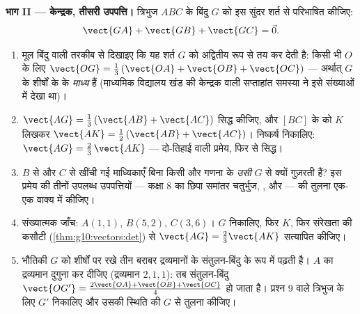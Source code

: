 \begin{problem}
\medskip
\noindent\textbf{भाग II --- केन्द्रक, तीसरी उपपत्ति।}
त्रिभुज $ABC$ के बिंदु $G$ को इस सुंदर शर्त से परिभाषित कीजिए:
\[
\vect{GA} + \vect{GB} + \vect{GC} = \vec 0 .
\]
\begin{enumerate}[resume]
  \item मूल बिंदु वाली तरकीब से दिखाइए कि यह शर्त $G$ को अद्वितीय रूप से
        तय कर देती है: किसी भी $O$ के लिए $\vect{OG} = \frac13\left(\vect{OA} + \vect{OB} +
        \vect{OC}\right)$ --- अर्थात् $G$ के
         शीर्षों के  के \emph{माध्य} हैं (माध्यमिक
        विद्यालय खंड की केन्द्रक वाली सप्ताहांत समस्या ने इसे संख्याओं में
        देखा था)।
  \item $\vect{AG} = \frac13\left(\vect{AB} +
        \vect{AC}\right)$ सिद्ध कीजिए, और $[BC]$ के  को $K$ लिखकर $\vect{AK} = \frac12\left(\vect{AB} +
        \vect{AC}\right)$।
        निष्कर्ष निकालिए: $\vect{AG} = \frac23\,\vect{AK}$ --- दो-तिहाई वाली प्रमेय, फिर से सिद्ध।
  \item $B$ से और $C$ से खींची गई माध्यिकाएँ बिना किसी और गणना के
        \emph{उसी} $G$ से क्यों गुज़रती हैं? इस प्रमेय की तीनों उपलब्ध
        उपपत्तियों --- कक्षा 8 का छिपा समांतर चतुर्भुज, , और
         --- की तुलना एक-एक वाक्य में कीजिए।
  \item संख्यात्मक जाँच: $A(1, 1)$, $B(5, 2)$, $C(3, 6)$। $G$ निकालिए, फिर $K$,
        फिर संरेखता की कसौटी (\cref{thm:g10:vectors:det}) से $\vect{AG} = \frac23 \vect{AK}$ सत्यापित कीजिए।
  \item भौतिकी $G$ को शीर्षों पर रखे तीन बराबर द्रव्यमानों के संतुलन-बिंदु
        के रूप में पढ़ती है। $A$ का द्रव्यमान दुगुना कर दीजिए (द्रव्यमान
        $2, 1, 1$): तब संतुलन-बिंदु $\vect{OG'} = \frac{2\vect{OA} + \vect{OB} +
        \vect{OC}}{4}$ हो जाता है। प्रश्न 9 वाले त्रिभुज के
        लिए $G'$ निकालिए और उसकी स्थिति की $G$ से तुलना कीजिए।
\end{enumerate}


\end{problem}

